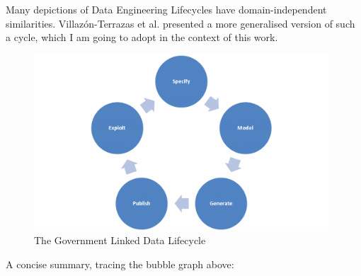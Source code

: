 \documentclass[a4paper,english,twoside,BCOR1.5cm,headsepline,DIV12,appendixprefix,final,12pt]{scrbook}
\begin{document}
Many depictions of Data Engineering Lifecycles have domain-independent similarities.
Villaz\'{o}n-Terrazas et al. presented a more generalised version of such a cycle, which I am going to adopt in the context of this work.

 \begin{figure}[!htbp]
\centering
  \includegraphics[width=11cm]{images/Villazon-terrazas.png}
  \caption{The Government Linked Data Lifecycle \cite{Terrazas}}
  \label{fig:gldlifecycle}
\end{figure}

A concise summary, tracing the bubble graph above:
\end{document}
